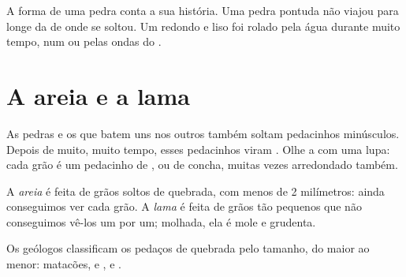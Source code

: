 \begin{remark}\label{rem:g3:stones-pebbles-sand:shape}
A forma de uma pedra conta a sua história. Uma pedra pontuda não viajou
para longe da  de onde se soltou. Um  redondo e liso foi rolado
pela água durante muito tempo, num  ou pelas ondas do .
\end{remark}

\section{A areia e a lama}

As pedras e os  que batem uns nos outros também soltam pedacinhos
minúsculos. Depois de muito, muito tempo, esses pedacinhos viram .
Olhe a  com uma lupa: cada grão é um pedacinho de , ou de
concha, muitas vezes arredondado também.

\begin{definition}\label{def:g3:stones-pebbles-sand:sand}
A \emph{areia} é feita de grãos soltos de  quebrada, com
menos de 2 milímetros: ainda conseguimos ver cada grão. A \emph{lama}
é feita de grãos tão pequenos que não conseguimos vê-los um por um;
molhada, ela é mole e grudenta.
\end{definition}

Os geólogos classificam os pedaços de  quebrada pelo tamanho, do maior
ao menor: matacões,  e ,  e .

